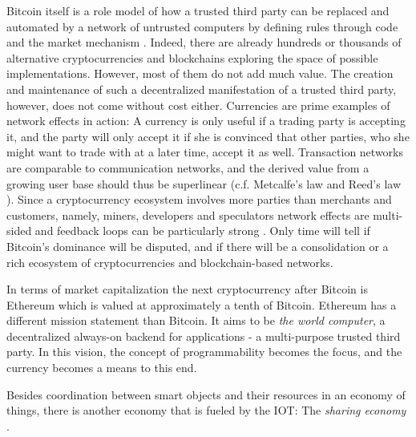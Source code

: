 Bitcoin itself is a role model of how a trusted third party can be replaced and automated by a network of untrusted computers by defining rules through code and the market mechanism \parencite{lessig2009code}. Indeed, there are already hundreds or thousands of alternative cryptocurrencies and blockchains exploring the space of possible implementations. However, most of them do not add much value. The creation and maintenance of such a decentralized manifestation of a trusted third party, however, does not come without cost either. Currencies are prime examples of network effects in action: A currency is only useful if a trading party is accepting it, and the party will only accept it if she is convinced that other parties, who she might want to trade with at a later time, accept it as well. Transaction networks are comparable to communication networks, and the derived value from a growing user base should thus be superlinear (c.f. Metcalfe's law \parencite{10.1109/MC.2013.374} and Reed's law \parencite{reed1999sneaky}). Since a cryptocurrency ecosystem involves more parties than merchants and customers, namely, miners, developers and speculators network effects are multi-sided and feedback loops can be particularly strong \parencite{Giaglis2014}. Only time will tell if Bitcoin's dominance will be disputed, and if there will be a consolidation or a rich ecosystem of cryptocurrencies and blockchain-based networks.

In terms of  market capitalization the next cryptocurrency after Bitcoin is Ethereum \parencite{ethereumWhite} which is valued at approximately a tenth of Bitcoin. Ethereum has a different mission statement than Bitcoin. It aims to be \emph{the world computer}, a decentralized always-on backend for applications - a multi-purpose trusted third party. In this vision, the concept of programmability becomes the focus, and the currency becomes a means to this end. 

Besides coordination between smart objects and their resources in an economy of things, there is another economy that is fueled by the \ac{IOT}: The \emph{sharing economy} \parencite{sundararajan2016sharing}.

